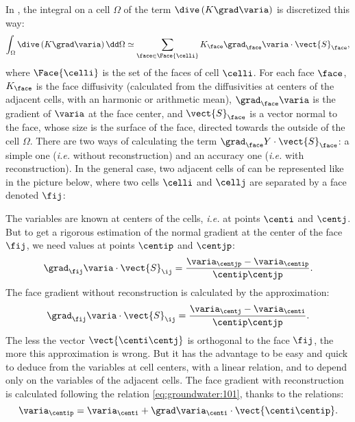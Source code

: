 In \CS, the integral on a cell $\Omega$ of the term $\dive \left( K \grad \varia \right)$ is discretized this way:
\begin{equation}
 \label{discrete_diffusive}
\int_{\Omega} \dive \left( K \grad \varia \right) \dd \Omega \simeq \sum_{\face \in \Face{\celli}} K_\face \grad_\face \varia \cdot \vect{S}_\face,
\end{equation}
where $\Face{\celli}$ is the set of the faces of cell $\celli$. For each face $\face$,
$K_\face$ is the face diffusivity (calculated from the diffusivities at centers of
the adjacent cells, with an harmonic or arithmetic mean),
$\grad_\face \varia$ is the gradient of $\varia$ at the face center,
and $\vect{S}_\face$ is a vector normal to the face, whose size is the surface of the face, directed towards the outside of the cell $\Omega$.
There are two ways of calculating the term $\grad_\face Y \cdot \vect{S}_\face$: a simple one (\emph{i.e.} without reconstruction)
and an accuracy one (\emph{i.e.} with reconstruction). In the general case, two adjacent cells of \CS can be represented like in the picture below,
where two cells $\celli$ and $\cellj$ are separated by a face denoted $\fij$:
\begin{figure}[!h]
\end{figure}
The variables are known at centers of the cells, \emph{i.e.} at points $\centi$ and $\centj$. But to get a rigorous estimation of the normal gradient at
the center of the face $\fij$, we need values at points $\centip$ and $\centjp$:
\begin{equation}
 \label{eq:groundwater:101}
\grad_{\fij}\varia \cdot \vect{S}_{\ij} = \frac{\varia_{\centjp}-\varia_{\centip}}{\centip\centjp}.
\end{equation}
The face gradient without reconstruction is calculated by the approximation:
\begin{equation}
 \label{eq:groundwater:102}
\grad_{\fij}\varia \cdot \vect{S}_{\ij} = \frac{\varia_{\centj}-\varia_{\centi}}{\centip\centjp}.
\end{equation}
The less the vector $\vect{\centi\centj}$ is orthogonal to the face $\fij$, the more this approximation is wrong. But it has the advantage to be easy and quick
to deduce from the variables at cell centers, with a linear relation, and to depend only on the variables of the adjacent cells.
The face gradient with reconstruction is calculated following the relation \eqref{eq:groundwater:101}, thanks to the relations:
\begin{equation}
 \label{103}
\varia_{\centip} = \varia_{\centi} + \grad \varia_\centi  \cdot \vect{\centi\centip}.
\end{equation}
